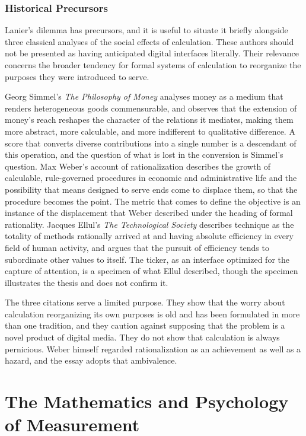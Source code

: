 \documentclass[11pt]{report}
\theoremstyle{definition}
\theoremstyle{remark}
\begin{document}
\section{Historical Precursors}

Lanier's dilemma has precursors, and it is useful to situate it briefly alongside three classical analyses of the social effects of calculation. These authors should not be presented as having anticipated digital interfaces literally. Their relevance concerns the broader tendency for formal systems of calculation to reorganize the purposes they were introduced to serve.

Georg Simmel's \emph{The Philosophy of Money} \cite{simmel} analyses money as a medium that renders heterogeneous goods commensurable, and observes that the extension of money's reach reshapes the character of the relations it mediates, making them more abstract, more calculable, and more indifferent to qualitative difference. A score that converts diverse contributions into a single number is a descendant of this operation, and the question of what is lost in the conversion is Simmel's question. Max Weber's account of rationalization \cite{weber} describes the growth of calculable, rule-governed procedures in economic and administrative life and the possibility that means designed to serve ends come to displace them, so that the procedure becomes the point. The metric that comes to define the objective is an instance of the displacement that Weber described under the heading of formal rationality. Jacques Ellul's \emph{The Technological Society} \cite{ellul} describes technique as the totality of methods rationally arrived at and having absolute efficiency in every field of human activity, and argues that the pursuit of efficiency tends to subordinate other values to itself. The ticker, as an interface optimized for the capture of attention, is a specimen of what Ellul described, though the specimen illustrates the thesis and does not confirm it.

The three citations serve a limited purpose. They show that the worry about calculation reorganizing its own purposes is old and has been formulated in more than one tradition, and they caution against supposing that the problem is a novel product of digital media. They do not show that calculation is always pernicious. Weber himself regarded rationalization as an achievement as well as a hazard, and the essay adopts that ambivalence.

\part{The Mathematics and Psychology of Measurement}
\end{document}
